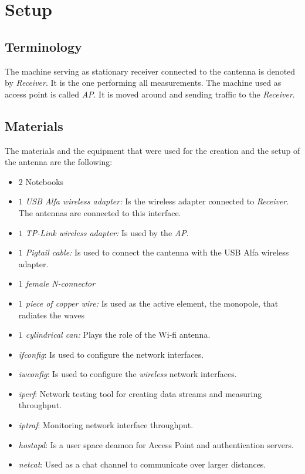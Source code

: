 \documentclass[12pt,a4paper]{article}
\newcommand{\rc}[0]{\emph{Receiver}}
\newcommand{\ap}[0]{\emph{AP}}
\begin{document}
\section{Setup}	
	
	\subsection{Terminology}
		The machine serving as stationary receiver connected to the cantenna is denoted by \rc. It is the one performing all measurements. The machine used as access point is called \ap. It is moved around and sending traffic to the \rc.
	
	\subsection{Materials}
		The materials and the equipment that were used for the creation and the setup of the antenna are the following: 
		\begin{itemize}
			\item $2$ Notebooks
			\item {\emph{$1$ USB Alfa wireless adapter:} Is the wireless adapter connected to \rc. The antennas are connected to this interface.} 
			\item {\emph{$1$ TP-Link wireless adapter:} Is used by the \ap.}
			\item {\emph{$1$ Pigtail cable:} Is used to connect the cantenna with the USB Alfa wireless adapter.}
			\item {\emph{$1$ female N-connector}}
			\item {\emph{$1$ piece of copper wire:} Is used as the active element, the monopole, that radiates the waves}
			\item {\emph{$1$ cylindrical can:} Plays the role of the Wi-fi antenna.} 
			\item \emph{ifconfig}: Is used to configure the network interfaces.
			\item \emph{iwconfig}: Is used to configure the \emph{wireless} network interfaces.
			\item \emph{iperf}: Network testing tool for creating data streams and measuring throughput.
			\item \emph{iptraf}: Monitoring network interface throughput.
			\item \emph{hostapd}: Is a user space deamon for Access Point and authentication servers.
			\item \emph{netcat}: Used as a chat channel to communicate over larger distances.
		\end{itemize}
	
\end{document}
